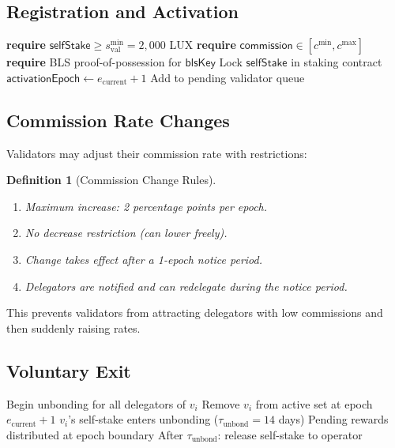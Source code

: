 \documentclass[11pt,a4paper]{article}
\newtheorem{definition}{Definition}
\begin{document}
\subsection{Registration and Activation}

\begin{algorithm}[H]
\caption{Validator Registration}
\label{alg:registration}
\begin{algorithmic}[1]
    \State \textbf{require} $\mathsf{selfStake} \geq s^{\min}_{\text{val}} = 2{,}000$ LUX
    \State \textbf{require} $\mathsf{commission} \in [c^{\min}, c^{\max}]$
    \State \textbf{require} BLS proof-of-possession for $\mathsf{blsKey}$
    \State Lock $\mathsf{selfStake}$ in staking contract
    \State $\mathsf{activationEpoch} \gets e_{\text{current}} + 1$
    \State Add to pending validator queue
\EndProcedure
\end{algorithmic}
\end{algorithm}

\subsection{Commission Rate Changes}

Validators may adjust their commission rate with restrictions:

\begin{definition}[Commission Change Rules]
\begin{enumerate}
    \item Maximum increase: 2 percentage points per epoch.
    \item No decrease restriction (can lower freely).
    \item Change takes effect after a 1-epoch notice period.
    \item Delegators are notified and can redelegate during the notice period.
\end{enumerate}
\end{definition}

This prevents validators from attracting delegators with low commissions and then suddenly raising rates.

\subsection{Voluntary Exit}

\begin{algorithm}[H]
\caption{Voluntary Validator Exit}
\label{alg:exit}
\begin{algorithmic}[1]
    \State Begin unbonding for all delegators of $v_i$
    \State Remove $v_i$ from active set at epoch $e_{\text{current}} + 1$
    \State $v_i$'s self-stake enters unbonding ($\tau_{\text{unbond}} = 14$ days)
    \State Pending rewards distributed at epoch boundary
    \State After $\tau_{\text{unbond}}$: release self-stake to operator
\EndProcedure
\end{algorithmic}
\end{algorithm}
\end{document}
